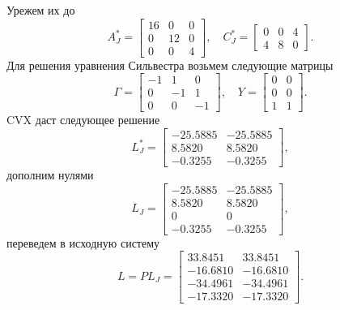 Урежем их до
\begin{equation*}
    A_J^*=\begin{bmatrix}
        16& 0& 0\\
        0& 12& 0\\
        0& 0& 4
    \end{bmatrix},\quad
    C_J^*=\begin{bmatrix}
        0& 0& 4\\
        4& 8& 0
    \end{bmatrix}.
\end{equation*}
Для решения уравнения Сильвестра возьмем следующие матрицы
\begin{equation*}
    \Gamma=\begin{bmatrix}
        -1&  1&  0\\
        0& -1&  1\\
        0&  0& -1
    \end{bmatrix},\quad
    Y=\begin{bmatrix}
        0& 0\\
        0& 0\\
        1& 1
    \end{bmatrix}.
\end{equation*}
CVX даст следующее решение
\begin{equation*}
    L_J^*=\begin{bmatrix}
        -25.5885&	-25.5885\\
        8.5820&	8.5820\\
        -0.3255&	-0.3255
    \end{bmatrix},
\end{equation*}
дополним нулями
\begin{equation*}
    L_J=\begin{bmatrix}
        -25.5885&	-25.5885\\
        8.5820&	8.5820\\
        0&	0\\
        -0.3255&	-0.3255
    \end{bmatrix},
\end{equation*}
переведем в исходную систему
\begin{equation*}
    L=PL_J=\begin{bmatrix}
        33.8451&	33.8451\\
        -16.6810&	-16.6810\\
        -34.4961&	-34.4961\\
        -17.3320&	-17.3320
    \end{bmatrix}.
\end{equation*}
